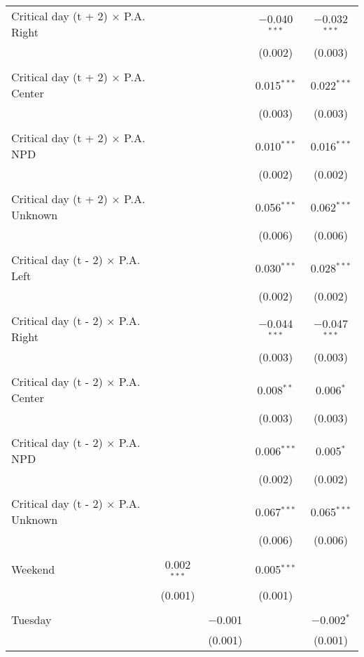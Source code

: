 \documentclass[
]{article}
\begin{document}
\begin{table}[!htbp]
{\begin{tabular}{@{\extracolsep{5pt}}lcccc}
 Critical day (t + 2) $\times$ P.A. Right &  &  & $-$0.040$^{***}$ & $-$0.032$^{***}$ \\ 
  &  &  & (0.002) & (0.003) \\ 
  & & & & \\ 
 Critical day (t + 2) $\times$ P.A. Center &  &  & 0.015$^{***}$ & 0.022$^{***}$ \\ 
  &  &  & (0.003) & (0.003) \\ 
  & & & & \\ 
 Critical day (t + 2) $\times$ P.A. NPD &  &  & 0.010$^{***}$ & 0.016$^{***}$ \\ 
  &  &  & (0.002) & (0.002) \\ 
  & & & & \\ 
 Critical day (t + 2) $\times$ P.A. Unknown &  &  & 0.056$^{***}$ & 0.062$^{***}$ \\ 
  &  &  & (0.006) & (0.006) \\ 
  & & & & \\ 
 Critical day (t - 2) $\times$ P.A. Left &  &  & 0.030$^{***}$ & 0.028$^{***}$ \\ 
  &  &  & (0.002) & (0.002) \\ 
  & & & & \\ 
 Critical day (t - 2) $\times$ P.A. Right &  &  & $-$0.044$^{***}$ & $-$0.047$^{***}$ \\ 
  &  &  & (0.003) & (0.003) \\ 
  & & & & \\ 
 Critical day (t - 2) $\times$ P.A. Center &  &  & 0.008$^{**}$ & 0.006$^{*}$ \\ 
  &  &  & (0.003) & (0.003) \\ 
  & & & & \\ 
 Critical day (t - 2) $\times$ P.A. NPD &  &  & 0.006$^{***}$ & 0.005$^{*}$ \\ 
  &  &  & (0.002) & (0.002) \\ 
  & & & & \\ 
 Critical day (t - 2) $\times$ P.A. Unknown &  &  & 0.067$^{***}$ & 0.065$^{***}$ \\ 
  &  &  & (0.006) & (0.006) \\ 
  & & & & \\ 
 Weekend & 0.002$^{***}$ &  & 0.005$^{***}$ &  \\ 
  & (0.001) &  & (0.001) &  \\ 
  & & & & \\ 
 Tuesday &  & $-$0.001 &  & $-$0.002$^{*}$ \\ 
  &  & (0.001) &  & (0.001) \\ 

\end{tabular}}
\end{table}
\end{document}
